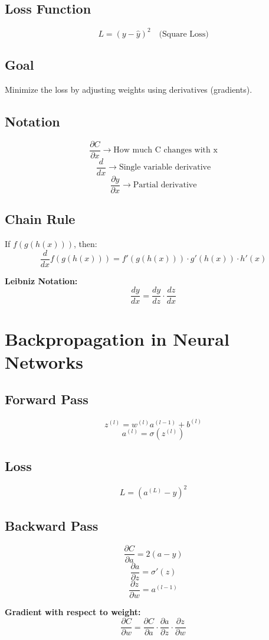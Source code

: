 \subsection*{Loss Function}
\[
L = (y - \hat{y})^2 \quad \text{(Square Loss)}
\]

\subsection*{Goal}
Minimize the loss by adjusting weights using derivatives (gradients).

\subsection*{Notation}
\[
\frac{\partial C}{\partial x} \rightarrow \text{How much C changes with x}
\]
\[
\frac{d}{dx} \rightarrow \text{Single variable derivative}
\]
\[
\frac{\partial y}{\partial x} \rightarrow \text{Partial derivative}
\]

\subsection*{Chain Rule}
If \( f(g(h(x))) \), then:
\[
\frac{d}{dx} f(g(h(x))) = f'(g(h(x))) \cdot g'(h(x)) \cdot h'(x)
\]

\textbf{Leibniz Notation:}
\[
\frac{dy}{dx} = \frac{dy}{dz} \cdot \frac{dz}{dx}
\]

\section{Backpropagation in Neural Networks}

\subsection*{Forward Pass}
\[
z^{(l)} = w^{(l)} a^{(l-1)} + b^{(l)}
\]
\[
a^{(l)} = \sigma(z^{(l)})
\]

\subsection*{Loss}
\[
L = (a^{(L)} - y)^2
\]

\subsection*{Backward Pass}
\[
\frac{\partial C}{\partial a} = 2(a - y)
\]
\[
\frac{\partial a}{\partial z} = \sigma'(z)
\]
\[
\frac{\partial z}{\partial w} = a^{(l-1)}
\]

\textbf{Gradient with respect to weight:}
\[
\frac{\partial C}{\partial w} = \frac{\partial C}{\partial a} \cdot \frac{\partial a}{\partial z} \cdot \frac{\partial z}{\partial w}
\]
